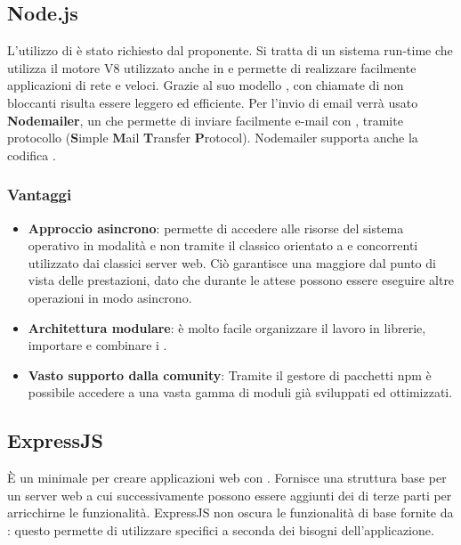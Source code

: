 \subsection{Node.js}
L'utilizzo di  \`e stato richiesto dal proponente. Si tratta di un sistema run-time  che utilizza il motore  V8 utilizzato anche in  e permette di realizzare facilmente applicazioni di rete  e veloci. Grazie al suo modello , con chiamate di  non bloccanti risulta essere leggero ed efficiente. Per l'invio di email verrà usato \textbf{Nodemailer}, un  che permette di inviare facilmente e-mail con , tramite protocollo  (\textbf{S}imple \textbf{M}ail \textbf{T}ransfer \textbf{P}rotocol). Nodemailer supporta anche la codifica .
\subsubsection{Vantaggi}
\begin{itemize}
\item \textbf{Approccio asincrono}: permette di accedere alle risorse del sistema operativo in modalit\`a  e non tramite il classico  orientato a  e  concorrenti utilizzato dai classici server web. Ci\`o garantisce una maggiore  dal punto di vista delle prestazioni, dato che durante le attese possono essere eseguire altre operazioni in modo asincrono.
\item \textbf{Architettura modulare}: \`e molto facile organizzare il lavoro in librerie, importare e combinare i .
\item \textbf{Vasto supporto dalla comunity}: Tramite il gestore di pacchetti npm è possibile accedere a una vasta gamma di moduli già sviluppati ed ottimizzati. 
\end{itemize}

\subsection{ExpressJS}
È un  minimale per creare applicazioni web con . Fornisce una struttura base per un server web a cui successivamente possono essere aggiunti dei  di terze parti per arricchirne le funzionalità. ExpressJS non oscura le funzionalità di base fornite da : questo permette di utilizzare  specifici a seconda dei bisogni dell'applicazione.
